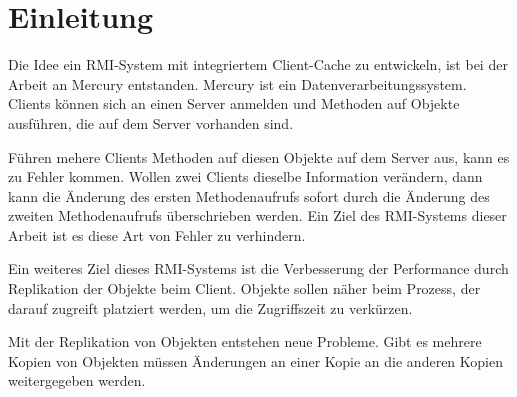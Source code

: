 \chapter{Einleitung}

Die Idee ein RMI-System mit integriertem Client-Cache zu entwickeln, ist bei der Arbeit an Mercury entstanden. Mercury ist ein Datenverarbeitungssystem. Clients können sich an einen Server anmelden und Methoden auf Objekte ausführen, die auf dem Server vorhanden sind. 

Führen mehere Clients Methoden auf diesen Objekte auf dem Server aus, kann es zu Fehler kommen. Wollen zwei Clients dieselbe Information verändern, dann kann die Änderung des ersten Methodenaufrufs sofort durch die Änderung des zweiten Methodenaufrufs überschrieben werden. Ein Ziel des RMI-Systems dieser Arbeit ist es diese Art von Fehler zu verhindern.

 Ein weiteres Ziel dieses RMI-Systems ist die Verbesserung der Performance durch Replikation der Objekte beim Client. Objekte sollen näher beim Prozess, der darauf zugreift platziert werden, um die Zugriffszeit zu verkürzen.

Mit der Replikation von Objekten entstehen neue Probleme. Gibt es mehrere Kopien von Objekten müssen Änderungen an einer Kopie an die anderen Kopien weitergegeben werden.